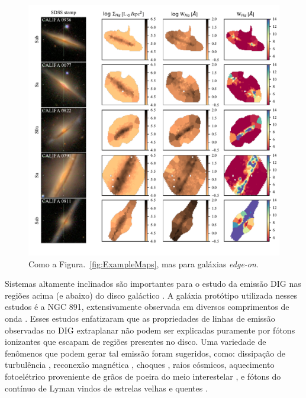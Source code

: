 \begin{figure}
 \includegraphics{figuras/fig_maps_class_edgeon_paper.pdf}
 \caption[Imagem \SDSS e mapas de $\Sigma_{{\rm H}\alpha}$ e $W_{{\rm H}\alpha}$: sistemas {\em edge-on}]
 {Como a Figura.\ \ref{fig:ExampleMaps}, mas para galáxias {\em edge-on}.}
 \label{fig:ExampleMapsEdgeOn}
\end{figure}

Sistemas altamente inclinados são importantes para o estudo da emissão DIG nas regiões acima (e abaixo) do disco galáctico \citep{Tullmann.and.Dettmar.2000, Otte.etal.2002, Jones.etal.2017}. A galáxia protótipo utilizada nesses estudos é a NGC 891, extensivamente observada em diversos comprimentos de onda \citep{Rand.1998, Hodges.and.Bregman.2013, Seon.etal.2014, Hughes.etal.2015}. Esses estudos enfatizaram que as propriedades de linhas de emissão observadas no DIG extraplanar não podem ser explicadas puramente por fótons ionizantes que escapam de regiões \hii presentes no disco. Uma variedade de fenômenos que podem  gerar tal emissão foram sugeridos, como: dissipação de turbulência \citep{Minter.and.Spangler.1997}, reconexão magnética \citep{Raymond.1992}, choques \citep{CollinsRand.2001}, raios cósmicos, aquecimento fotoelétrico proveniente de grãos de poeira do meio interestelar  \citep{Weingartner.and.Draine.2001}, e fótons do contínuo de Lyman vindos de estrelas velhas e quentes \citep{FloresFajardo.etal.2011a}.

